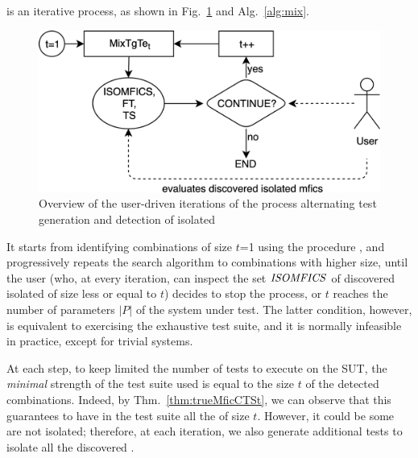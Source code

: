 \begin{tikzborder}{\cite{Gargantini16:validation}}
\begin{tikzborder}{\cite{gargantini_combinatorial_2017}}
\begin{tikzborder}{\cite{garn2019}}
\begin{tikzborder}{\cite{arcaini2019achieving}}
\begin{tikzborder}{}
\mix is an iterative process, as shown in Fig.~\ref{fig:overallProcess} and Alg.~\ref{alg:mix}.
%
\begin{figure}[!htb]
	\centering
	\includegraphics[width=.9\columnwidth]{images/process_mix_fl_tg}
	\caption{Overview of the user-driven iterations of the process alternating test generation and detection of isolated \mfics}
	\label{fig:overallProcess}
\end{figure}
%
\begin{algorithm}[!htb]
	\begin{algorithmic}[1]
		\State{$\isoMficsSet \gets \emptyset$}\label{line:initMFICS}
		\State{$\ft \gets \emptyset$}\label{line:initFT2}
		\State{$\ts \gets \emptyset$}\label{line:initTS}
		\label{line:initT}
		\label{line:call}
		\label{line:increaseT}
		\EndWhile
	\end{algorithmic}
	\caption{\mix}
	\label{alg:mix}
\end{algorithm}
%
It starts from identifying combinations of size $t$=1 using the procedure \mixt, and progressively repeats the search algorithm to combinations with higher size, until the user (who, at every iteration, can inspect the set $\mathit{ISOMFICS}$ of discovered isolated \mfics of size less or equal to $t$) decides to stop the process, or $t$ reaches the number of parameters $\vert P \vert$ of the system under test. The latter condition, however, is equivalent to exercising the exhaustive test suite, and it is normally infeasible in practice, except for trivial systems.

At each step, to keep limited the number of tests to execute on the SUT, the {\it minimal} strength of the test suite used is equal to the size $t$ of the detected combinations. Indeed, by Thm.~\ref{thm:trueMficCTSt}, we can observe that this guarantees to have in the test suite all the \mfics of size $t$. However, it could be some \mfics are not isolated; therefore, at each iteration, we also generate additional tests to isolate all the discovered \mfics.


\end{tikzborder}
\end{tikzborder}
\end{tikzborder}
\end{tikzborder}
\end{tikzborder}
